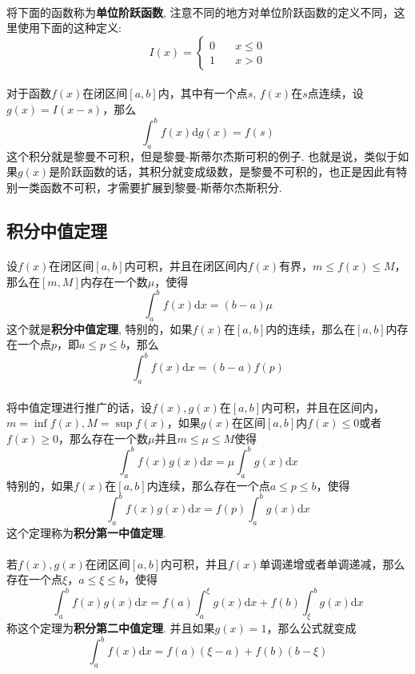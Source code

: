 \paragraph{}
将下面的函数称为\textbf{单位阶跃函数}, 注意不同的地方对单位阶跃函数的定义不同，这里使用下面的这种定义:
$$
I(x) = \begin{cases}
0 & \quad x \leq 0 \\
1 & \quad x > 0
\end{cases}
$$

\paragraph{}
对于函数$f(x)$在闭区间$[a, b]$内，其中有一个点$s$, $f(x)$在$s$点连续，设$g(x) = I(x - s)$，那么
$$
\int_a^b f(x) \mathrm{d} g(x) = f(s)
$$
这个积分就是黎曼不可积，但是黎曼-斯蒂尔杰斯可积的例子. 也就是说，类似于如果$g(x)$是阶跃函数的话，其积分就变成级数，是黎曼不可积的，也正是因此有特别一类函数不可积，才需要扩展到黎曼-斯蒂尔杰斯积分.

\subsection{积分中值定理}
\paragraph{}
设$f(x)$在闭区间$[a, b]$内可积，并且在闭区间内$f(x)$有界，$m \leq f(x) \leq M$，那么在$[m, M]$内存在一个数$\mu $，使得
$$
\int_a^b f(x) \mathrm{d} x = (b - a) \mu
$$
这个就是\textbf{积分中值定理}, 特别的，如果$f(x)$在$[a, b]$内的连续，那么在$[a, b]$内存在一个点$p$，即$a \leq p \leq b$，那么
$$
\int_a^b f(x) \mathrm{d} x = (b - a) f(p)
$$

\paragraph{}
将中值定理进行推广的话，设$f(x), g(x)$在$[a, b]$内可积，并且在区间内，$m = \inf f(x), M = \sup f(x)$，如果$g(x)$在区间$[a, b]$内$f(x) \leq 0$或者$f(x) \geq 0$，那么存在一个数$\mu$并且$m \leq \mu \leq M$使得
$$
\int_a^b f(x) g(x) \mathrm{d} x = \mu \int_a^b g(x) \mathrm{d} x
$$
特别的，如果$f(x)$在$[a, b]$内连续，那么存在一个点$a \leq p \leq b$，使得
$$
\int_a^b f(x) g(x) \mathrm{d} x = f(p) \int_a^b g(x) \mathrm{d} x
$$
这个定理称为\textbf{积分第一中值定理}. 

\paragraph{}
若$f(x), g(x)$在闭区间$[a, b]$内可积，并且$f(x)$单调递增或者单调递减，那么存在一个点$\xi$，$a \leq \xi \leq b$，使得
$$
\int_a^b f(x) g(x) \mathrm{d} x = f(a) \int_a^\xi g(x) \mathrm{d} x + f(b) \int_\xi^b g(x) \mathrm{d} x
$$
称这个定理为\textbf{积分第二中值定理}. 并且如果$g(x) = 1$，那么公式就变成
$$
\int_a^b f(x)\mathrm{d} x = f(a) (\xi - a) + f(b) (b - \xi)
$$


